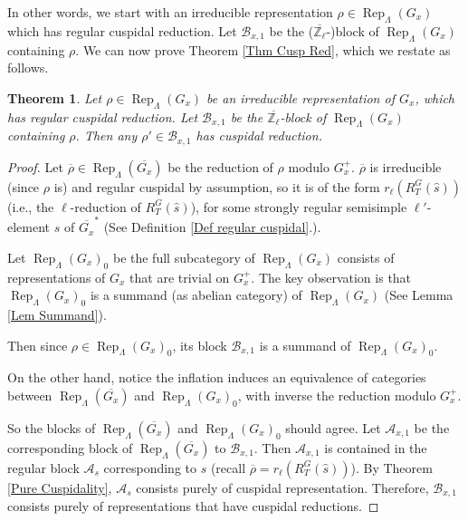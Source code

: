 \documentclass{article}
\newtheorem{theorem}{Theorem}
\newcommand{\Rep}{\operatorname{Rep}}
\begin{document}
	In other words, we start with an irreducible representation $\rho \in \Rep_{\Lambda}(G_x)$ which has regular cuspidal reduction. Let $\mathcal{B}_{x,1}$ be the ($\overline{\mathbb{Z}_{\ell}}$-)block of $\Rep_{\Lambda}(G_x)$ containing $\rho$. We can now prove Theorem \ref{Thm Cusp Red}, which we restate as follows.
	
	\begin{theorem}
		Let $\rho \in \Rep_{\Lambda}(G_x)$ be an irreducible representation of $G_x$, which has regular cuspidal reduction. Let $\mathcal{B}_{x,1}$ be the $\overline{\mathbb{Z}_{\ell}}$-block of $\Rep_{\Lambda}(G_x)$ containing $\rho$. Then any $\rho' \in \mathcal{B}_{x,1}$ has cuspidal reduction.
	\end{theorem}
	
	\begin{proof}
		Let $\overline{\rho} \in \Rep_{\Lambda}(\overline{G_x})$ be the reduction of $\rho$ modulo $G_x^+$. $\overline{\rho}$ is irreducible (since $\rho$ is) and regular cuspidal by assumption, so it is of the form $r_{\ell}(R_T^G(\hat{s}))$ (i.e., the $\ell$-reduction of $R_T^G(\hat{s})$), for some strongly regular semisimple $\ell'$-element $s$ of $\overline{G_x}^*$ (See Definition \ref{Def regular cuspidal}.). 
		
		Let $\Rep_{\Lambda}(G_x)_0$ be the full subcategory of $\Rep_{\Lambda}(G_x)$ consists of representations of $G_x$ that are trivial on $G_x^+$. The key observation is that $\Rep_{\Lambda}(G_x)_0$ is a summand (as abelian category) of $\Rep_{\Lambda}(G_x)$ (See Lemma \ref{Lem Summand}).
		
		Then since $\rho \in \Rep_{\Lambda}(G_x)_0$, its block $\mathcal{B}_{x,1}$ is a summand of $\Rep_{\Lambda}(G_x)_0$.
		
		On the other hand, notice the inflation induces an equivalence of categories between $\Rep_{\Lambda}(\overline{G_x})$ and $\Rep_{\Lambda}(G_x)_0$, with inverse the reduction modulo $G_x^+$.
		
		So the blocks of $\Rep_{\Lambda}(\overline{G_x})$ and $\Rep_{\Lambda}(G_x)_0$ should agree. Let $\mathcal{A}_{x,1}$ be the corresponding block of $\Rep_{\Lambda}(\overline{G_x})$ to $\mathcal{B}_{x,1}$. Then $\mathcal{A}_{x,1}$ is contained in the regular block $\mathcal{A}_s$ corresponding to $s$ (recall $\overline{\rho}=r_{\ell}(R_T^G(\hat{s}))$). By Theorem \ref{Pure Cuspidality}, $\mathcal{A}_s$ consists purely of cuspidal representation. Therefore, $\mathcal{B}_{x,1}$ consists purely of representations that have cuspidal reductions. 
	\end{proof}
	
\end{document}

